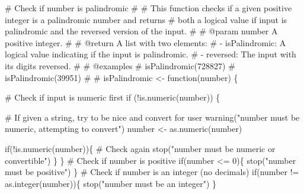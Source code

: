 \documentclass[
  letterpaper,
  DIV=11,
  numbers=noendperiod]{scrartcl}
\newenvironment{Shaded}{\begin{snugshade}}{\end{snugshade}}
\newcommand{\CommentTok}[1]{\textcolor[rgb]{0.37,0.37,0.37}{#1}}
\newcommand{\ControlFlowTok}[1]{\textcolor[rgb]{0.00,0.23,0.31}{#1}}
\newcommand{\DecValTok}[1]{\textcolor[rgb]{0.68,0.00,0.00}{#1}}
\newcommand{\FunctionTok}[1]{\textcolor[rgb]{0.28,0.35,0.67}{#1}}
\newcommand{\NormalTok}[1]{\textcolor[rgb]{0.00,0.23,0.31}{#1}}
\newcommand{\OtherTok}[1]{\textcolor[rgb]{0.00,0.23,0.31}{#1}}
\newcommand{\SpecialCharTok}[1]{\textcolor[rgb]{0.37,0.37,0.37}{#1}}
\newcommand{\StringTok}[1]{\textcolor[rgb]{0.13,0.47,0.30}{#1}}
\begin{document}
\begin{Shaded}
\begin{Highlighting}[]
\CommentTok{\#\textquotesingle{} Check if number is palindromic}
\CommentTok{\#\textquotesingle{}}
\CommentTok{\#\textquotesingle{} This function checks if a given positive integer is a palindromic number and returns}
\CommentTok{\#\textquotesingle{} both a logical value if input is palindromic and the reversed version of the input.}
\CommentTok{\#\textquotesingle{}}
\CommentTok{\#\textquotesingle{} @param number A positive integer.}
\CommentTok{\#\textquotesingle{}}
\CommentTok{\#\textquotesingle{} @return A list with two elements: }
\CommentTok{\#\textquotesingle{} {-} \textasciigrave{}isPalindromic\textasciigrave{}: A logical value indicating if the input is palindromic.}
\CommentTok{\#\textquotesingle{} {-} \textasciigrave{}reversed\textasciigrave{}: The input with its digits reversed.}
\CommentTok{\#\textquotesingle{} }
\CommentTok{\#\textquotesingle{} @examples}
\CommentTok{\#\textquotesingle{} isPalindromic(728827)}
\CommentTok{\#\textquotesingle{} isPalindromic(39951)}
\CommentTok{\#\textquotesingle{} }
\CommentTok{\#\textquotesingle{} }
\NormalTok{isPalindromic }\OtherTok{\textless{}{-}} \ControlFlowTok{function}\NormalTok{(number) \{}
  
  \CommentTok{\# Check if input is numeric first}
  \ControlFlowTok{if}\NormalTok{ (}\SpecialCharTok{!}\FunctionTok{is.numeric}\NormalTok{(number)) \{}
    
    \CommentTok{\# If given a string, try to be nice and convert for user}
    \FunctionTok{warning}\NormalTok{(}\StringTok{"number must be numeric, attempting to convert"}\NormalTok{)}
\NormalTok{    number }\OtherTok{\textless{}{-}} \FunctionTok{as.numeric}\NormalTok{(number) }
    
    \ControlFlowTok{if}\NormalTok{(}\SpecialCharTok{!}\FunctionTok{is.numeric}\NormalTok{(number))\{ }\CommentTok{\# Check again}
      \FunctionTok{stop}\NormalTok{(}\StringTok{"number must be numeric or convertible"}\NormalTok{)}
\NormalTok{    \}}
\NormalTok{  \}}
  \CommentTok{\# Check if number is positive}
  \ControlFlowTok{if}\NormalTok{(number }\SpecialCharTok{\textless{}=} \DecValTok{0}\NormalTok{)\{}
    \FunctionTok{stop}\NormalTok{(}\StringTok{"number must be positive"}\NormalTok{)}
\NormalTok{  \}}
  \CommentTok{\# Check if number is an integer (no decimals)}
  \ControlFlowTok{if}\NormalTok{(number }\SpecialCharTok{!=} \FunctionTok{as.integer}\NormalTok{(number))\{}
    \FunctionTok{stop}\NormalTok{(}\StringTok{"number must be an integer"}\NormalTok{)}
\NormalTok{  \}}


\end{Highlighting}
\end{Shaded}
\end{document}
